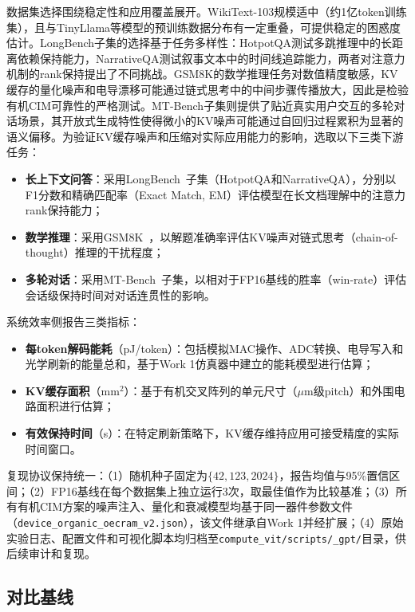 数据集选择围绕稳定性和应用覆盖展开。WikiText-103规模适中（约1亿token训练集），且与TinyLlama等模型的预训练数据分布有一定重叠，可提供稳定的困惑度估计。LongBench子集的选择基于任务多样性：HotpotQA测试多跳推理中的长距离依赖保持能力，NarrativeQA测试叙事文本中的时间线追踪能力，两者对注意力机制的rank保持提出了不同挑战。GSM8K的数学推理任务对数值精度敏感，KV缓存的量化噪声和电导漂移可能通过链式思考中的中间步骤传播放大，因此是检验有机CIM可靠性的严格测试。MT-Bench子集则提供了贴近真实用户交互的多轮对话场景，其开放式生成特性使得微小的KV噪声可能通过自回归过程累积为显著的语义偏移。为验证KV缓存噪声和压缩对实际应用能力的影响，选取以下三类下游任务：

\begin{itemize}
    \item \textbf{长上下文问答}：采用LongBench~\cite{bai2023longbench}子集（HotpotQA和NarrativeQA），分别以F1分数和精确匹配率（Exact Match, EM）评估模型在长文档理解中的注意力rank保持能力；
    \item \textbf{数学推理}：采用GSM8K~\cite{cobbe2021training}，以解题准确率评估KV噪声对链式思考（chain-of-thought）推理的干扰程度；
    \item \textbf{多轮对话}：采用MT-Bench~\cite{zheng2023judging}子集，以相对于FP16基线的胜率（win-rate）评估会话级保持时间对对话连贯性的影响。
\end{itemize}

系统效率侧报告三类指标：
\begin{itemize}
    \item \textbf{每token解码能耗}（pJ/token）：包括模拟MAC操作、ADC转换、电导写入和光学刷新的能量总和，基于Work 1仿真器中建立的能耗模型进行估算；
    \item \textbf{KV缓存面积}（mm$^2$）：基于有机交叉阵列的单元尺寸（$\mu$m级pitch）和外围电路面积进行估算；
    \item \textbf{有效保持时间}（s）：在特定刷新策略下，KV缓存维持应用可接受精度的实际时间窗口。
\end{itemize}

复现协议保持统一：（1）随机种子固定为$\{42, 123, 2024\}$，报告均值与95\%置信区间；（2）FP16基线在每个数据集上独立运行3次，取最佳值作为比较基准；（3）所有有机CIM方案的噪声注入、量化和衰减模型均基于同一器件参数文件（\texttt{device\_organic\_oecram\_v2.json}），该文件继承自Work 1并经扩展；（4）原始实验日志、配置文件和可视化脚本均归档至\texttt{compute\_vit/scripts/\_gpt/}目录，供后续审计和复现。

\subsection{对比基线}

